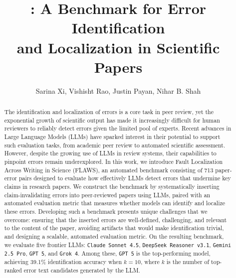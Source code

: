 \documentclass{article}
\title{\benchmark{}: A Benchmark for Error Identification\\ and Localization in Scientific Papers}
\author[ ]{Sarina Xi, Vishisht Rao, Justin Payan, Nihar B. Shah}
\affil[ ]{\{sarinax, vsrao, jpayan, nihars\}@cs.cmu.edu}
\affil[ ]{\cmu}
\date{}
\newcommand{\gemini}{\texttt{Gemini 2.5 Pro}}
\newcommand{\gpt}{\texttt{GPT 5}}
\newcommand{\grok}{\texttt{Grok 4}}
\newcommand{\deepseek}{\texttt{DeepSeek Reasoner v3.1}}
\newcommand{\claude}{\texttt{Claude Sonnet 4.5}}
\newcommand{\benchmark}{FLAWS}
\begin{document}
\maketitle

\begin{abstract}

The identification and localization of errors is a core task in peer review, yet the exponential growth of scientific output has made it increasingly difficult for human reviewers to reliably detect errors given the limited pool of experts. Recent advances in Large Language Models (LLMs) have sparked interest in their potential to support such evaluation tasks, from academic peer review to automated scientific assessment. However, despite the growing use of LLMs in review systems, their capabilities to pinpoint errors remain underexplored. In this work, we introduce Fault Localization Across Writing in Science (\benchmark{}), an automated benchmark consisting of 713 paper-error pairs designed to evaluate how effectively LLMs detect errors that undermine key claims in research papers. We construct the benchmark by systematically inserting claim-invalidating errors into peer-reviewed papers using LLMs, paired with an automated evaluation metric that measures whether models can identify and localize these errors. Developing such a benchmark presents unique challenges that we overcome: ensuring that the inserted errors are well-defined, challenging, and relevant to the content of the paper, avoiding artifacts that would make identification trivial, and designing a scalable, automated evaluation metric. On the resulting benchmark, we evaluate five frontier LLMs: \claude{}, \deepseek{}, \gemini{}, \gpt{}, and \grok{}. Among these, \gpt{} is the top-performing model, achieving 39.1\% identification accuracy when $k=10$, where $k$ is the number of top-ranked error text candidates generated by the LLM.
\end{abstract}
\end{document}
